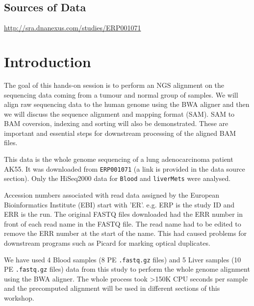 \subsection{Sources of Data}
  \url{http://sra.dnanexus.com/studies/ERP001071}

\clearpage

\section{Introduction}

\begin{information}
The goal of this hands-on session is to perform an NGS alignment on the sequencing data coming from a tumour and normal group of samples. We will align raw sequencing data to the human genome using the BWA aligner and then we will discuss the sequence alignment and mapping format (SAM). SAM to BAM coversion, indexing and sorting will also be demonstrated. These are important and essential steps for downstream processing of the aligned BAM files. 
 
This data is the whole genome sequencing of a lung adenocarcinoma patient AK55. It was downloaded from \texttt{ERP001071} (a link is provided in the data source section). Only the HiSeq2000 data for \texttt{Blood} and \texttt{liverMets} were analysed.
\end{information}

\begin{note}
Accession numbers associated with read data assigned by the European Bioinformatics Institute (EBI) start with 'ER'. e.g. ERP is the study ID and ERR is the run. The original FASTQ files downloaded had the ERR number in front of each read name in the FASTQ file. The read name had to be edited to remove the ERR number at the start of the name. This had caused problems for downstream programs such as Picard for marking optical duplicates.
\end{note}

\begin{information}
We have used 4 Blood samples (8 PE \texttt{.fastq.gz} files) and 5 Liver samples (10 PE \texttt{.fastq.gz} files) data from this study to perform the whole genome alignment using the BWA aligner. The whole process took \textgreater 150K CPU seconds per sample and the precomputed alignment will be used in different sections of this workshop. 
\end{information}

